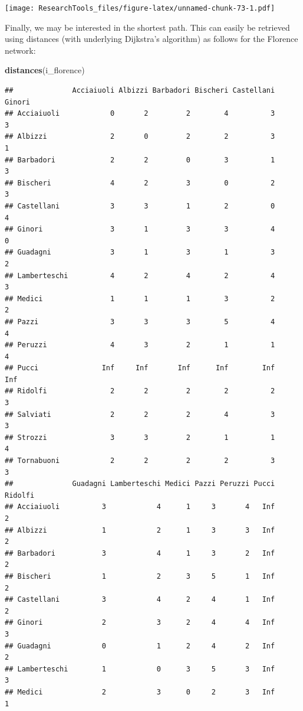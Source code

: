 \documentclass[]{article}
\newenvironment{Shaded}{\begin{snugshade}}{\end{snugshade}}
\newcommand{\KeywordTok}[1]{\textcolor[rgb]{0.13,0.29,0.53}{\textbf{#1}}}
\newcommand{\NormalTok}[1]{#1}
\theoremstyle{definition}
\theoremstyle{definition}
\theoremstyle{definition}
\theoremstyle{remark}
\begin{document}
\texttt{[image: ResearchTools\_files/figure-latex/unnamed-chunk-73-1.pdf]}

Finally, we may be interested in the shortest path. This can easily be
retrieved using distances (with underlying Dijkstra's algorithm) as
follows for the Florence network:

\begin{Shaded}
\begin{Highlighting}[]
\KeywordTok{distances}\NormalTok{(i_florence)}
\end{Highlighting}
\end{Shaded}

\begin{verbatim}
##              Acciaiuoli Albizzi Barbadori Bischeri Castellani Ginori
## Acciaiuoli            0       2         2        4          3      3
## Albizzi               2       0         2        2          3      1
## Barbadori             2       2         0        3          1      3
## Bischeri              4       2         3        0          2      3
## Castellani            3       3         1        2          0      4
## Ginori                3       1         3        3          4      0
## Guadagni              3       1         3        1          3      2
## Lamberteschi          4       2         4        2          4      3
## Medici                1       1         1        3          2      2
## Pazzi                 3       3         3        5          4      4
## Peruzzi               4       3         2        1          1      4
## Pucci               Inf     Inf       Inf      Inf        Inf    Inf
## Ridolfi               2       2         2        2          2      3
## Salviati              2       2         2        4          3      3
## Strozzi               3       3         2        1          1      4
## Tornabuoni            2       2         2        2          3      3
##              Guadagni Lamberteschi Medici Pazzi Peruzzi Pucci Ridolfi
## Acciaiuoli          3            4      1     3       4   Inf       2
## Albizzi             1            2      1     3       3   Inf       2
## Barbadori           3            4      1     3       2   Inf       2
## Bischeri            1            2      3     5       1   Inf       2
## Castellani          3            4      2     4       1   Inf       2
## Ginori              2            3      2     4       4   Inf       3
## Guadagni            0            1      2     4       2   Inf       2
## Lamberteschi        1            0      3     5       3   Inf       3
## Medici              2            3      0     2       3   Inf       1

\end{verbatim}
\end{document}
